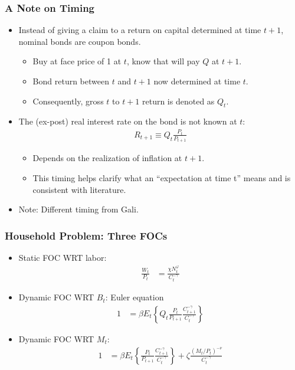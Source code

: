 \documentclass[english,xcolor=svgnames]{beamer}
\begin{document}
\begin{frame}
\frametitle{A Note on Timing}
\begin{itemize}
	\item Instead of giving a claim to a return on capital determined at time $t+1$, nominal bonds are coupon bonds.
\begin{itemize}
	\item Buy at face price of 1 at $t$, know that will pay $Q$ at $t+1$.
	\item Bond return between $t$ and $t+1$ now determined at time $t$.
	\item Consequently, gross $t$ to $t+1$ return is denoted as $Q_t$.
	\end{itemize}
	\item The (ex-post) real interest rate on the bond is not known at $t$:
	\begin{align*}
		R_{t+1}\equiv Q_t \frac{P_t}{P_{t+1}}
	\end{align*}
	\begin{itemize}
	\item Depends on the realization of inflation at $t+1$.
	\item This timing helps clarify what an ``expectation at time t'' means and is consistent with literature.
	\end{itemize}
	\item Note: Different timing from Gali.
\end{itemize}
\end{frame}


\begin{frame}
\frametitle{Household Problem: Three FOCs
}
\begin{itemize}
	\item Static FOC WRT labor:
	\begin{align*}
	\frac{W_t}{P_t}&=\frac{\chi N_t^\varphi}{C_t^{-\gamma}}
	\end{align*}
	\item Dynamic FOC WRT $B_t$: Euler equation
	\begin{align*}
		1&=\beta E_t\left\{Q_t \frac{P_t}{P_{t+1}} \frac{C_{t+1}^{-\gamma}}{C_{t}^{-\gamma}}\right\}
	\end{align*}
	\item Dynamic FOC WRT $M_t$:
	\begin{align*}
		1&=\beta E_t\left\{\frac{P_t}{P_{t+1}} \frac{C_{t+1}^{-\gamma}}{C_{t}^{-\gamma}}\right\}+\zeta\frac{(M_t/P_t)^{-\nu}}{C_{t}^{-\gamma}}
	\end{align*}
	\end{itemize}
\end{frame}
\end{document}
